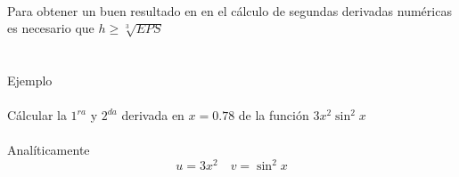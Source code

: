 \\
Para obtener un buen resultado en en el c\'alculo de segundas derivadas num\'ericas es necesario que $h\geq\sqrt[3]{EPS}$ \\ \\ \\
Ejemplo\\ \\
C\'alcular la $1^{ra}$ y $2^{da}$ derivada en $x=0.78$ de la funci\'on $3x^2\sin^2x$\\ \\
Anal\'iticamente \\
\begin{displaymath}
u=3x^2\quad v=\sin^2x
\end{displaymath}
